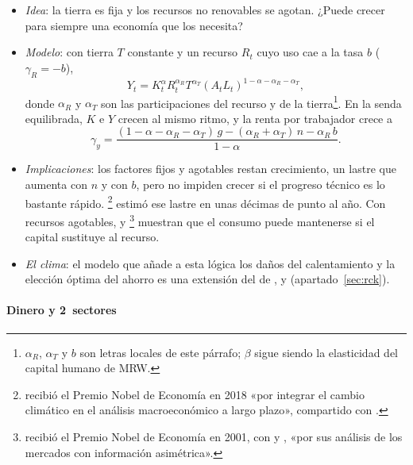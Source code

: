\documentclass[11pt]{article}
\begin{document}
\begin{itemize}
\item \emph{Idea}: la tierra es fija y los recursos no renovables se agotan. ¿Puede crecer para siempre una economía que los necesita?
\item \emph{Modelo}: con tierra $T$ constante y un recurso $R_t$ cuyo uso cae a la tasa $b$ ($\gamma_R=-b$),
  \[Y_t=K_t^{\alpha}R_t^{\alpha_R}T^{\alpha_T}(A_tL_t)^{1-\alpha-\alpha_R-\alpha_T},\]
  donde $\alpha_R$ y $\alpha_T$ son las participaciones del recurso y de la tierra\footnote{$\alpha_R$, $\alpha_T$ y $b$ son letras locales de este párrafo; $\beta$ sigue siendo la elasticidad del capital humano de MRW.}. En la senda equilibrada, $K$ e $Y$ crecen al mismo ritmo, y la renta por trabajador crece a
  \[\gamma_y=\frac{(1-\alpha-\alpha_R-\alpha_T)\,g-(\alpha_R+\alpha_T)\,n-\alpha_R\,b}{1-\alpha}.\]
\item \emph{Implicaciones}: los factores fijos y agotables restan crecimiento, un lastre que aumenta con $n$ y con $b$, pero no impiden crecer si el progreso técnico es lo bastante rápido\nocite{Romer2019Advanced}. \textcite{Nordhaus1992}\footnote{ recibió el Premio Nobel de Economía en 2018 «por integrar el cambio climático en el análisis macroeconómico a largo plazo», compartido con \nocite{Nobel2018Nordhaus}.} estimó ese lastre en unas décimas de punto al año. Con recursos agotables, \textcite{Solow1974} y \textcite{Stiglitz1974}\footnote{ recibió el Premio Nobel de Economía en 2001, con  y , «por sus análisis de los mercados con información asimétrica»\nocite{Nobel2001AkerlofSpenceStiglitz}.} muestran que el consumo puede mantenerse si el capital sustituye al recurso.
\item \emph{El clima}: el modelo que añade a esta lógica los daños del calentamiento y la elección óptima del ahorro es una extensión del de ,  y  (apartado~\ref{sec:rck}).
\end{itemize}

\paragraph{Dinero y 2~sectores}
\end{document}
